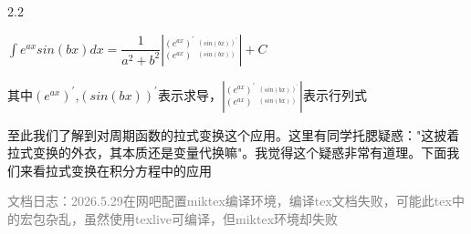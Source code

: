 \documentclass[12pt]{report}
\begin{document}
  \vspace{-7pt}
  
  \begin{spacing}{2.2}
  	 \begin{center}
  		$\int e^{ax}sin\left(bx\right)dx=\dfrac{1}{a^{2}+b^{2}}\left|_{\left(e^{ax}\right)}^{\left(e^{ax}\right)^{\prime}}\:_{^{\left(sin\left(bx\right)\right)}}^{^{\left(sin\left(bx\right)\right)^{\prime}}}\right|+C$ 
  		
  		其中$\left(e^{ax}\right)^{\prime}$,$\left(sin\left(bx\right)\right)^{\prime}$表示求导，$\left|_{\left(e^{ax}\right)}^{\left(e^{ax}\right)^{\prime}}\:_{^{\left(sin\left(bx\right)\right)}}^{^{\left(sin\left(bx\right)\right)^{\prime}}}\right|$表示行列式
  	\end{center}
  \end{spacing}
 
  至此我们了解到对周期函数的拉式变换这个应用。这里有同学托腮疑惑："这披着拉式变换的外衣，其本质还是变量代换嘛"。我觉得这个疑惑非常有道理。下面我们来看拉式变换在积分方程中的应用
  
  \textcolor{gray}{文档日志：2026.5.29在网吧配置miktex编译环境，编译tex文档失败，可能此tex中的宏包杂乱，虽然使用texlive可编译，但miktex环境却失败}
  
   
% 		
% 		
 

   
\end{document}
